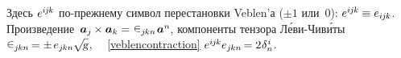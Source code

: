 \begin{otherlanguage}{russian}
\vspace{-0.2em}\noindent
Здесь ${e^{i\hspace{-0.1ex}j\hspace{-0.1ex}k}}$ по\hbox{-}прежнему символ перестановки Veblen’а (${\pm 1}$ или~$0$):
${e^{i\hspace{-0.1ex}j\hspace{-0.1ex}k} \hspace{-0.1ex} \equiv e_{i\hspace{-0.1ex}j\hspace{-0.1ex}k}}$.
Произведение~${\bm{a}_j \hspace{-0.1ex} \times \bm{a}_k = \hspace{.1ex} \levicivita_{j\hspace{-0.1ex}kn} \hspace{.2ex} \bm{a}^n\hspace{-0.12ex}}$, компоненты тензора Л\'{е}ви\hbox{-\!}Чив\'{и}ты~${ \levicivita_{j\hspace{-0.1ex}kn} \hspace{-0.2ex} = \pm \hspace{.33ex} e_{j\hspace{-0.1ex}kn} \hspace{-0.1ex} \sqrt{\hspace{-0.36ex}\mathstrut{\textsl{g}}} }$,
~~\eqref{veblencontraction} ${e^{i\hspace{-0.1ex}j\hspace{-0.1ex}k} e_{j\hspace{-0.1ex}kn} \hspace{-0.25ex} = 2 \hspace{.1ex} \delta_n^{\hspace{.1ex}i}}$.


\end{otherlanguage}

